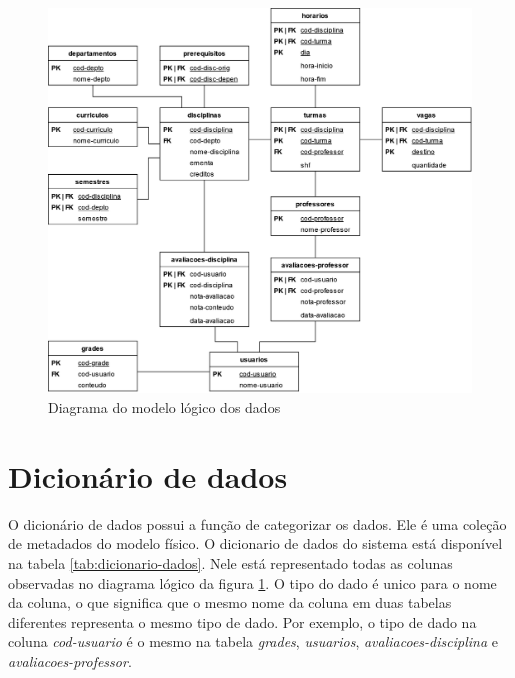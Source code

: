 \begin{figure}[ht]
    \begin{center}
    \includegraphics[width=390pt]{figuras/diagrama-logico.png}
    \caption{Diagrama do modelo lógico dos dados}
    \label{fig:modelo-logico}
    \end{center}
\end{figure}

\section{Dicionário de dados}

O dicionário de dados possui a função de categorizar os dados. Ele é uma coleção de metadados do modelo físico. O dicionario de dados do sistema está disponível na tabela \ref{tab:dicionario-dados}. Nele está representado todas as colunas observadas no diagrama lógico da figura \ref{fig:modelo-logico}. O tipo do dado é unico para o nome da coluna, o que significa que o mesmo nome da coluna em duas tabelas diferentes representa o mesmo tipo de dado. Por exemplo, o tipo de dado na coluna \textit{cod-usuario} é o mesmo na tabela \textit{grades}, \textit{usuarios}, \textit{avaliacoes-disciplina} e \textit{avaliacoes-professor}.

